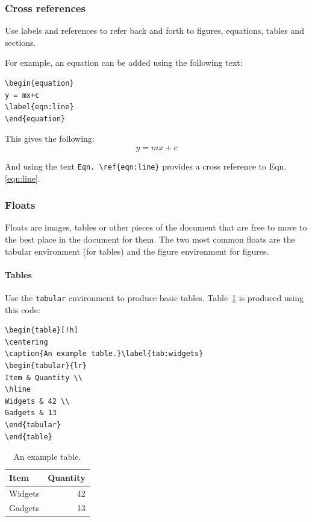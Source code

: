 \subsubsection{Cross references}
Use labels and references to refer back and forth to figures, equations, tables and sections. 

For example, an equation can be added using the following text:

\begin{lstlisting}
\begin{equation}
y = mx+c
\label{eqn:line}
\end{equation}
\end{lstlisting}

This gives the following:
\begin{equation}
y = mx+c
\label{eqn:line}
\end{equation}

And using the text \verb+Eqn. \ref{eqn:line}+ provides a cross reference to Eqn. \ref{eqn:line}.

\subsubsection{Floats}
Floats are images, tables or other pieces of the document that are free to move to the best place in the document for them. The two most common floats are the tabular environment (for tables) and the figure environment for figures.

\paragraph{Tables}
Use the \texttt{tabular} environment to produce basic tables. Table~\ref{tab:widgets} is produced using this code: 

\begin{lstlisting}
\begin{table}[!h]
\centering
\caption{An example table.}\label{tab:widgets}
\begin{tabular}{lr}
Item & Quantity \\
\hline
Widgets & 42 \\
Gadgets & 13
\end{tabular}
\end{table}
\end{lstlisting}

\begin{table}[!h]
\centering
\caption{An example table.}\label{tab:widgets}
\begin{tabular}{lr}
Item & Quantity \\
\hline
Widgets & 42 \\
Gadgets & 13
\end{tabular}
\end{table}

